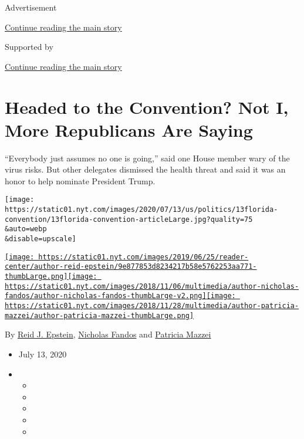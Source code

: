 Advertisement

\protect\hyperlink{after-top}{Continue reading the main story}

Supported by

\protect\hyperlink{after-sponsor}{Continue reading the main story}

\hypertarget{headed-to-the-convention-not-i-more-republicans-are-saying}{%
\section{Headed to the Convention? Not I, More Republicans Are
Saying}\label{headed-to-the-convention-not-i-more-republicans-are-saying}}

``Everybody just assumes no one is going,'' said one House member wary
of the virus risks. But other delegates dismissed the health threat and
said it was an honor to help nominate President Trump.

\texttt{[image: https://static01.nyt.com/images/2020/07/13/us/politics/13florida-convention/13florida-convention-articleLarge.jpg?quality=75\\\&auto=webp\\\&disable=upscale]}

\href{https://www.nytimes.com/by/reid-j-epstein}{\texttt{[image: https://static01.nyt.com/images/2019/06/25/reader-center/author-reid-epstein/9e877853d8234217b58e5762253aa771-thumbLarge.png]}}\href{https://www.nytimes.com/by/nicholas-fandos}{\texttt{[image: https://static01.nyt.com/images/2018/11/06/multimedia/author-nicholas-fandos/author-nicholas-fandos-thumbLarge-v2.png]}}\href{https://www.nytimes.com/by/patricia-mazzei}{\texttt{[image: https://static01.nyt.com/images/2018/11/28/multimedia/author-patricia-mazzei/author-patricia-mazzei-thumbLarge.png]}}

By \href{https://www.nytimes.com/by/reid-j-epstein}{Reid J. Epstein},
\href{https://www.nytimes.com/by/nicholas-fandos}{Nicholas Fandos} and
\href{https://www.nytimes.com/by/patricia-mazzei}{Patricia Mazzei}

\begin{itemize}
\item
  July 13, 2020
\item
  \begin{itemize}
  \item
  \item
  \item
  \item
  \item
  \end{itemize}
\end{itemize}

